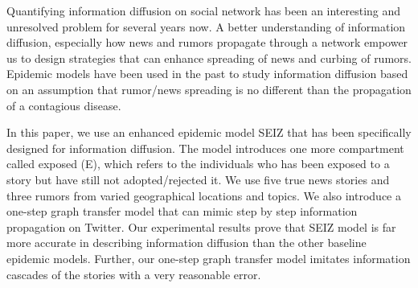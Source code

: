Quantifying information diffusion on social network has been an interesting and unresolved problem for several years now. A better understanding of information diffusion, especially how news and rumors propagate through a network empower us to design strategies that can enhance spreading of news and curbing of rumors. Epidemic models have been used in the past to study information diffusion based on an assumption that rumor/news spreading is no different than the propagation of a contagious disease.

In this paper, we use an enhanced epidemic model SEIZ that has been specifically designed for information diffusion. The model introduces one more compartment called exposed (E), which refers to the individuals who has been exposed to a story but have still not adopted/rejected it. We use five true news stories and three rumors from varied geographical locations and topics. We also introduce a one-step graph transfer model that can mimic step by step information propagation on Twitter. Our experimental results prove that SEIZ model is far more accurate in describing information diffusion than the other baseline epidemic models. Further, our one-step graph transfer model imitates information cascades of the stories with a very reasonable error. 

%
